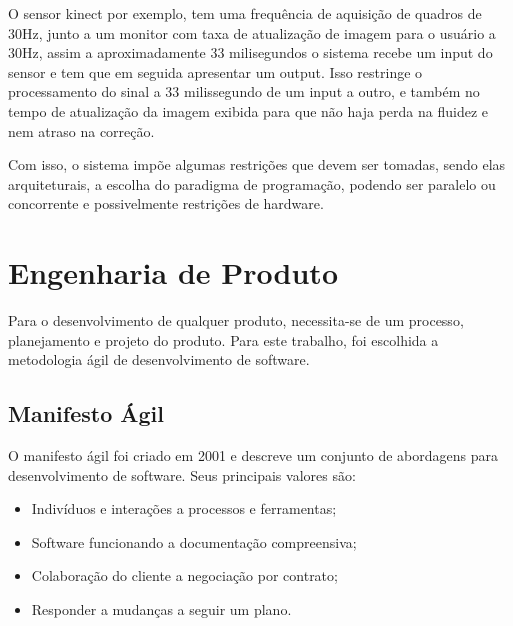   O sensor kinect \cite{microsoftResearch} por exemplo, tem uma frequência de 
aquisição de quadros de 30Hz, junto a um monitor com taxa de atualização de imagem  
para o usuário a 30Hz, assim a aproximadamente 33 milisegundos o 
sistema recebe um input do sensor e tem que em seguida apresentar um output. Isso
 restringe o processamento do sinal a 33 milissegundo de um input a outro, e 
também no tempo de atualização da imagem exibida para que não haja perda na 
fluidez e nem atraso na correção.

  Com isso, o sistema impõe algumas restrições que devem ser tomadas,
sendo elas arquiteturais, a escolha do  paradigma de programação, podendo ser paralelo ou 
concorrente e possivelmente restrições de hardware.


\section{Engenharia de Produto}
\label{Sec:Engenharia de Produto}
  Para o desenvolvimento de qualquer produto, necessita-se de um processo, 
planejamento e projeto do produto. Para este trabalho, foi escolhida a 
metodologia ágil de desenvolvimento de software.
\subsection{Manifesto Ágil}
\label{Sec:Manifesto Ágil}
  O manifesto ágil foi criado em 2001 e descreve um conjunto de abordagens para
desenvolvimento de software.
  Seus principais valores são:
  \begin{itemize}
  \item Indivíduos e interações a processos e ferramentas;
  \item Software funcionando a documentação compreensiva;
  \item Colaboração do cliente a negociação por contrato;
  \item Responder a mudanças a seguir um plano.\cite{manifestoAgil}
  \end{itemize}

